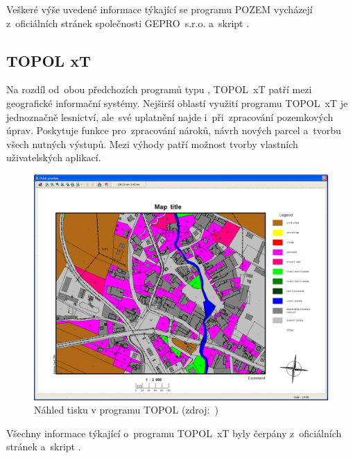 Veškeré výše uvedené informace týkající se programu POZEM vycházejí z~oficiálních stránek společnosti GEPRO~s.r.o. \citep{proland} a~skript \citep{pu_skripta}.

\subsection{TOPOL xT}
\label{topol_xt}

Na rozdíl od~obou předchozích programů typu , TOPOL~xT patří mezi geografické informační systémy. Nejširší oblastí využití programu TOPOL~xT je jednoznačně lesnictví, ale~své uplatnění najde i~při~zpracování pozemkových úprav. Poskytuje funkce pro~zpracování nároků, návrh nových parcel a~tvorbu všech nutných výstupů. Mezi výhody patří možnost tvorby vlastních uživatelských aplikací.

	\begin{figure}[H]
		\centering
		\includegraphics[width=.8\textwidth]{./pictures/topol.png}
		\caption[Náhled tisku v programu TOPOL xT]{Náhled tisku v programu TOPOL (zdroj:~\citep{topol})}
		\label{fig:topol_obrazek}
 	\end{figure}

Všechny informace týkající o~programu TOPOL~xT byly čerpány z~oficiálních stránek \citep{topol} a~skript \citep{pu_skripta}.